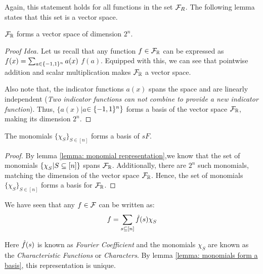 Again, this statement holds for all functions in the set $\mathcal{F}_R$. The following lemma states that this set is a vector space. 

\begin{lemma}
    $\mathcal{F}_{\mathbb{R}}$ forms a vector space of dimension $2^n$.

    \begin{proof}[Proof Idea]
        Let us recall that any function $f \in \mathcal{F}_{\mathbb{R}}$ can be expressed as $f(x)  = \sum_{a \in \{-1,1\}^n} a(x)$ $f(a)$. Equipped with this, we can see that pointwise addition and scalar multiplication makes $\mathcal{F}_{\mathbb{R}}$ a vector space. 
        
        Also note that, the indicator functions $a(x)$ spans the space and are linearly independent (\textit{Two indicator functions can not combine to provide a new indicator function}). Thus, $\{a(x)|a$$\in \{-1,1\}^n\}$ forms a basis of the vector space $\mathcal{F}_{\mathbb{R}}$, making its dimension $2^n$.
    \end{proof}
\end{lemma}


\begin{lemma}\label{lemma: monomials form a basis}
    The monomials $\{\chi_S\}_{S \in [n]}$ forms a basis of $sF$.

    \begin{proof}
        By lemma \ref{lemma: monomial representation},we know that the set of monomials $\set{\chi_S|S \subseteq [n]}$ spans $\mathcal{F}_{\mathbb{R}}$. Additionally, there are $2^n$ such monomials, matching the dimension of the vector space $\mathcal{F}_{\mathbb{R}}$. Hence, the set of monomials $\{\chi_S\}_{S \in [n]}$ forms a basis for $\mathcal{F}_{\mathbb{R}}$.
    \end{proof}
\end{lemma}

\begin{note}\label{fet}
    We have seen that any $f \in \mathcal{F}$ can be written as:
    \begin{align*}
        f = \sum_{s \subseteq [n]} \fhat(s)\chi_S
    \end{align*}

    Here $\hat{f}(s)$ is known as \emph{Fourier Coefficient} and the monomials $\chi_S$ are known as the \emph{Characteristic Functions} or \emph{Characters}. By lemma \ref{lemma: monomials form a basis}, this representation is unique. 
\end{note}

